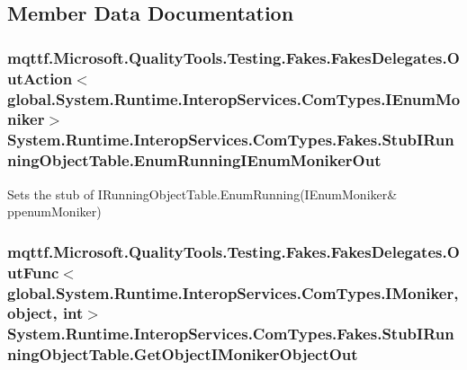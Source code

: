\subsection{Member Data Documentation}
\hypertarget{class_system_1_1_runtime_1_1_interop_services_1_1_com_types_1_1_fakes_1_1_stub_i_running_object_table_a1922e5f4f422c1999a75e54779936aff}{
\subsubsection[{Enum\-Running\-I\-Enum\-Moniker\-Out}]{\setlength{\rightskip}{0pt plus 5cm}mqttf.\-Microsoft.\-Quality\-Tools.\-Testing.\-Fakes.\-Fakes\-Delegates.\-Out\-Action$<$global.\-System.\-Runtime.\-Interop\-Services.\-Com\-Types.\-I\-Enum\-Moniker$>$ System.\-Runtime.\-Interop\-Services.\-Com\-Types.\-Fakes.\-Stub\-I\-Running\-Object\-Table.\-Enum\-Running\-I\-Enum\-Moniker\-Out}}\label{class_system_1_1_runtime_1_1_interop_services_1_1_com_types_1_1_fakes_1_1_stub_i_running_object_table_a1922e5f4f422c1999a75e54779936aff}


Sets the stub of I\-Running\-Object\-Table.\-Enum\-Running(I\-Enum\-Moniker\& ppenum\-Moniker)

\hypertarget{class_system_1_1_runtime_1_1_interop_services_1_1_com_types_1_1_fakes_1_1_stub_i_running_object_table_a03e2548eb8af3a4d9d7c79faf93214fa}{
\subsubsection[{Get\-Object\-I\-Moniker\-Object\-Out}]{\setlength{\rightskip}{0pt plus 5cm}mqttf.\-Microsoft.\-Quality\-Tools.\-Testing.\-Fakes.\-Fakes\-Delegates.\-Out\-Func$<$global.\-System.\-Runtime.\-Interop\-Services.\-Com\-Types.\-I\-Moniker, object, int$>$ System.\-Runtime.\-Interop\-Services.\-Com\-Types.\-Fakes.\-Stub\-I\-Running\-Object\-Table.\-Get\-Object\-I\-Moniker\-Object\-Out}}\label{class_system_1_1_runtime_1_1_interop_services_1_1_com_types_1_1_fakes_1_1_stub_i_running_object_table_a03e2548eb8af3a4d9d7c79faf93214fa}


